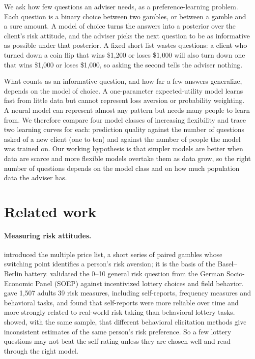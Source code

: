 \documentclass{article}
\begin{document}
We ask how few questions an adviser needs, as a preference-learning problem. Each question is a binary choice between two gambles, or between a gamble and a sure amount. A model of choice turns the answers into a posterior over the client's risk attitude, and the adviser picks the next question to be as informative as possible under that posterior. A fixed short list wastes questions: a client who turned down a coin flip that wins \$1,200 or loses \$1,000 will also turn down one that wins \$1,000 or loses \$1,000, so asking the second tells the adviser nothing.

What counts as an informative question, and how far a few answers generalize, depends on the model of choice. A one-parameter expected-utility model learns fast from little data but cannot represent loss aversion or probability weighting. A neural model can represent almost any pattern but needs many people to learn from. We therefore compare four model classes of increasing flexibility and trace two learning curves for each: prediction quality against the number of questions asked of a new client (one to ten) and against the number of people the model was trained on. Our working hypothesis is that simpler models are better when data are scarce and more flexible models overtake them as data grow, so the right number of questions depends on the model class and on how much population data the adviser has.

\section{Related work}

\paragraph{Measuring risk attitudes.}
\citet{holt2002} introduced the multiple price list, a short series of paired gambles whose switching point identifies a person's risk aversion; it is the basis of the Basel--Berlin battery. \citet{dohmen2011} validated the 0--10 general risk question from the German Socio-Economic Panel (SOEP) against incentivized lottery choices and field behavior. \citet{frey2017} gave 1,507 adults 39 risk measures, including self-reports, frequency measures and behavioral tasks, and found that self-reports were more reliable over time and more strongly related to real-world risk taking than behavioral lottery tasks. \citet{pedroni2017} showed, with the same sample, that different behavioral elicitation methods give inconsistent estimates of the same person's risk preference. So a few lottery questions may not beat the self-rating unless they are chosen well and read through the right model.
\end{document}
